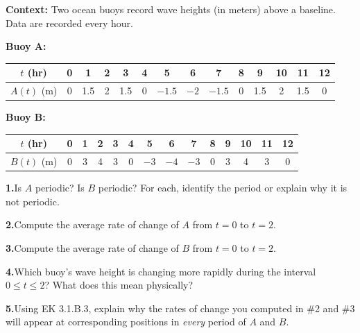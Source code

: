 \documentclass[10pt]{article}
\begin{document}
\begin{tcolorbox}[colback=white, colframe=black!40,
    title=\textbf{Tier E --- Extend},
    fonttitle=\bfseries, arc=2mm, left=3mm, right=3mm, top=2mm, bottom=2mm]

\textbf{Context:} Two ocean buoys record wave heights (in meters) above a
baseline. Data are recorded every hour.

\vspace{4pt}
\textbf{Buoy A:}
\begin{center}
\renewcommand{\arraystretch}{1.3}
\small
\begin{tabular}{|c|c|c|c|c|c|c|c|c|c|c|c|c|c|}
\hline
$t$ (hr) & 0 & 1 & 2 & 3 & 4 & 5 & 6 & 7 & 8 & 9 & 10 & 11 & 12 \\
\hline
$A(t)$ (m) & 0 & 1.5 & 2 & 1.5 & 0 & $-1.5$ & $-2$ & $-1.5$ & 0 & 1.5 & 2 & 1.5 & 0 \\
\hline
\end{tabular}
\end{center}

\vspace{4pt}
\textbf{Buoy B:}
\begin{center}
\renewcommand{\arraystretch}{1.3}
\small
\begin{tabular}{|c|c|c|c|c|c|c|c|c|c|c|c|c|c|}
\hline
$t$ (hr) & 0 & 1 & 2 & 3 & 4 & 5 & 6 & 7 & 8 & 9 & 10 & 11 & 12 \\
\hline
$B(t)$ (m) & 0 & 3 & 4 & 3 & 0 & $-3$ & $-4$ & $-3$ & 0 & 3 & 4 & 3 & 0 \\
\hline
\end{tabular}
\end{center}

\vspace{6pt}
\textbf{1.}\quad Is $A$ periodic? Is $B$ periodic? For each, identify the
period or explain why it is not periodic.

\vspace{4pt}
\textbf{2.}\quad Compute the average rate of change of $A$ from $t=0$ to $t=2$.

\vspace{4pt}
\textbf{3.}\quad Compute the average rate of change of $B$ from $t=0$ to $t=2$.

\vspace{4pt}
\textbf{4.}\quad Which buoy's wave height is changing more rapidly during the
interval $0 \leq t \leq 2$? What does this mean physically?

\vspace{4pt}
\textbf{5.}\quad Using EK 3.1.B.3, explain why the rates of change you computed
in \#2 and \#3 will appear at corresponding positions in \emph{every} period
of $A$ and $B$.

\end{tcolorbox}
\end{document}
